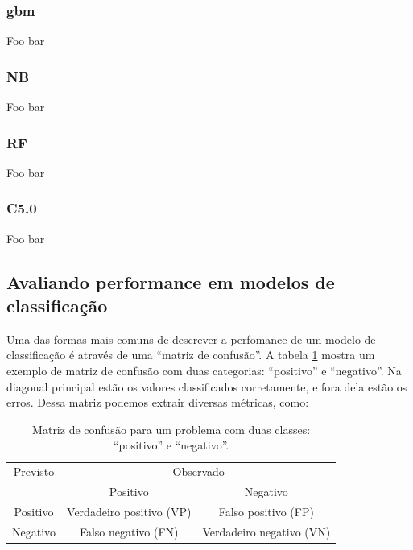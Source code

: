 \documentclass[a4paper,titlepage]{ppgi}\usepackage[]{graphicx}\usepackage[]{color}
\begin{document}
\subsubsection{gbm}
Foo bar

\subsubsection{NB}
Foo bar

\subsubsection{RF}
Foo bar

\subsubsection{C5.0}
Foo bar

\subsection{Avaliando performance em modelos de classificação}
\label{cap:fundamentacao:avaliando-modelos-de-classificacao}

\nocite{Ng2012}

Uma das formas mais comuns de descrever a perfomance de um modelo de
classificação é através de uma ``matriz de confusão''. A tabela
\ref{table:exemplo-matriz-de-confusao} mostra um exemplo de matriz de confusão
com duas categorias: ``positivo'' e ``negativo''. Na diagonal principal estão
os valores classificados corretamente, e fora dela estão os erros. Dessa matriz
podemos extrair diversas métricas, como:

\begin{table}
\centering
\begin{tabular}{c c c}
  Previsto & \multicolumn{2}{c}{Observado} \\  \cline{2-3}
  & \multicolumn{1}{|c}{Positivo} & \multicolumn{1}{c|}{Negativo} \\
  \hline
  \multicolumn{1}{|c|}{Positivo} & Verdadeiro positivo (VP) & \multicolumn{1}{c|}{Falso positivo (FP)} \\
  \multicolumn{1}{|c|}{Negativo} & Falso negativo (FN) & \multicolumn{1}{c|}{Verdadeiro negativo (VN)} \\
  \hline
\end{tabular}
\caption{Matriz de confusão para um problema com duas classes: ``positivo'' e
``negativo''.}
\label{table:exemplo-matriz-de-confusao}
\end{table}
\end{document}
